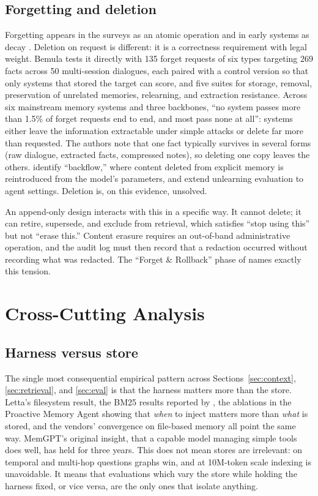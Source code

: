 \documentclass[11pt]{article}
\begin{document}
\subsection{Forgetting and deletion}

Forgetting appears in the surveys as an atomic operation \citep{du2025rethinking} and in early systems as decay \citep{zhong2023memorybank}. Deletion on request is different: it is a correctness requirement with legal weight. Bemula \citep{xie2026bemula} tests it directly with 135 forget requests of six types targeting 269 facts across 50 multi-session dialogues, each paired with a control version so that only systems that stored the target can score, and five suites for storage, removal, preservation of unrelated memories, relearning, and extraction resistance. Across six mainstream memory systems and three backbones, ``no system passes more than 1.5\% of forget requests end to end, and most pass none at all'': systems either leave the information extractable under simple attacks or delete far more than requested. The authors note that one fact typically survives in several forms (raw dialogue, extracted facts, compressed notes), so deleting one copy leaves the others. \citet{wang2026unlearning} identify ``backflow,'' where content deleted from explicit memory is reintroduced from the model's parameters, and \citet{lin2026forget} extend unlearning evaluation to agent settings. Deletion is, on this evidence, unsolved.

An append-only design interacts with this in a specific way. It cannot delete; it can retire, supersede, and exclude from retrieval, which satisfies ``stop using this'' but not ``erase this.'' Content erasure requires an out-of-band administrative operation, and the audit log must then record that a redaction occurred without recording what was redacted. The ``Forget \& Rollback'' phase of \citet{lin2026security} names exactly this tension.

\section{Cross-Cutting Analysis}
\label{sec:crosscutting}

\subsection{Harness versus store}

The single most consequential empirical pattern across Sections~\ref{sec:context}, \ref{sec:retrieval}, and \ref{sec:eval} is that the harness matters more than the store. Letta's filesystem result, the BM25 results reported by \citet{kumar2026agentmemory}, the ablations in the Proactive Memory Agent showing that \emph{when} to inject matters more than \emph{what} is stored, and the vendors' convergence on file-based memory all point the same way. MemGPT's original insight, that a capable model managing simple tools does well, has held for three years. This does not mean stores are irrelevant: on temporal and multi-hop questions graphs win, and at 10M-token scale indexing is unavoidable. It means that evaluations which vary the store while holding the harness fixed, or vice versa, are the only ones that isolate anything.
\end{document}
